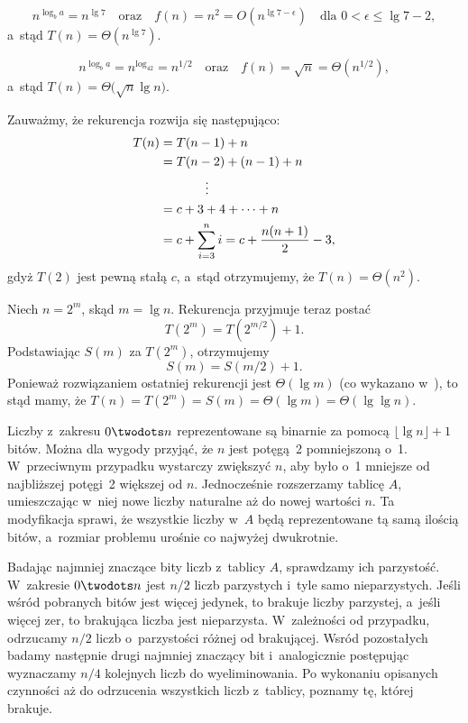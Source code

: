 \subproblem %
\[
	n^{\log_ba} = n^{\lg7} \quad\text{oraz}\quad f(n) = n^2 = O(n^{\lg7-\epsilon}) \quad\text{dla $0<\epsilon\le\lg7-2$},
\]
a~stąd $T(n)=\Theta(n^{\lg7})$.

\subproblem %
\[
	n^{\log_ba} = n^{\log_42} = n^{1/2} \quad\text{oraz}\quad f(n) = \sqrt{n} = \Theta(n^{1/2}),
\]
a~stąd $T(n)=\Theta\bigl(\!\sqrt{n}\lg n\bigr)$.

\subproblem %
Zauważmy, że rekurencja rozwija się następująco:
\begin{align*}
	T(n) &= T(n-1)+n \\
	&= T(n-2)+(n-1)+n \\
	&\hspace{.5in}\vdots \\
	&= c+3+4+\cdots+n \\
	&= c+\sum_{i=3}^ni = c+\frac{n(n+1)}{2}-3,
\end{align*}
gdyż $T(2)$ jest pewną stałą $c$, a~stąd otrzymujemy, że $T(n)=\Theta(n^2)$.

\subproblem %
Niech $n=2^m$, skąd $m=\lg n$. Rekurencja przyjmuje teraz postać
\[
	T(2^m) = T(2^{m/2})+1.
\]
Podstawiając $S(m)$ za $T(2^m)$, otrzymujemy
\[
	S(m) = S(m/2)+1.
\]
Ponieważ rozwiązaniem ostatniej rekurencji jest $\Theta(\lg m)$ (co wykazano w~), to stąd mamy, że $T(n)=T(2^m)=S(m)=\Theta(\lg m)=\Theta(\lg\lg n)$.

Liczby z~zakresu $0\twodots n$ reprezentowane są binarnie za pomocą $\lfloor\lg n\rfloor+1$ bitów. Można dla wygody przyjąć, że $n$ jest potęgą~2 pomniejszoną o~1. W~przeciwnym przypadku wystarczy zwiększyć $n$, aby było o~1 mniejsze od najbliższej potęgi~2 większej od $n$. Jednocześnie rozszerzamy tablicę $A$, umieszczając w~niej nowe liczby naturalne aż do nowej wartości $n$. Ta modyfikacja sprawi, że wszystkie liczby w~$A$ będą reprezentowane tą samą ilością bitów, a~rozmiar problemu urośnie co najwyżej dwukrotnie.

Badając najmniej znaczące bity liczb z~tablicy $A$, sprawdzamy ich parzystość. W~zakresie $0\twodots n$ jest $n/2$ liczb parzystych i~tyle samo nieparzystych. Jeśli wśród pobranych bitów jest więcej jedynek, to brakuje liczby parzystej, a~jeśli więcej zer, to brakująca liczba jest nieparzysta. W~zależności od przypadku, odrzucamy $n/2$ liczb o~parzystości różnej od brakującej. Wsród pozostałych badamy następnie drugi najmniej znaczący bit i~analogicznie postępując wyznaczamy $n/4$ kolejnych liczb do wyeliminowania. Po wykonaniu opisanych czynności aż do odrzucenia wszystkich liczb z~tablicy, poznamy tę, której brakuje.

